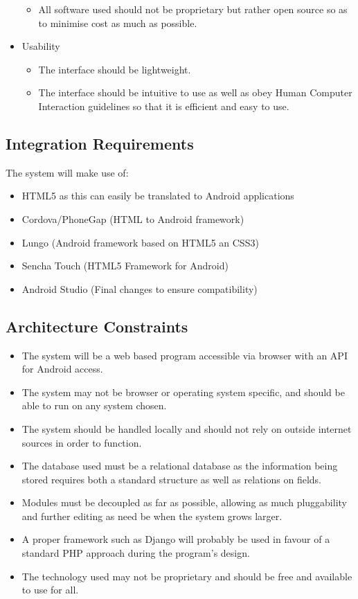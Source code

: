 \documentclass{article}
\begin{document}
\begin{itemize}
\begin{itemize}
					\item All software used should not be proprietary but rather open source so as to minimise cost as much as possible.
				\end{itemize}
				\item Usability
				\begin{itemize}
					\item The interface should be lightweight.
					\item The interface should be intuitive to use as well as obey Human Computer Interaction guidelines so that it is efficient and easy to use.
				\end{itemize}
			\end{itemize}
		
		\cleardoublepage
		\subsection{Integration Requirements}\label{subsec:integration}
		The system will make use of:
			\begin{itemize}
			  	\item HTML5 as this can easily be translated to Android applications
			  	\item Cordova/PhoneGap (HTML to Android framework)
			  	\item Lungo (Android framework based on HTML5 an CSS3)
			  	\item Sencha Touch (HTML5 Framework for Android)
			  	\item Android Studio (Final changes to ensure compatibility)
			\end{itemize}
				
		\subsection{Architecture Constraints}\label{subsec:constraints}
			\begin{itemize}
				\item The system will be a web based program accessible via browser with an API for Android access.
			  	\item The system may not be browser or operating system specific, and should be able to run on any system chosen.
			  	\item The system should be handled locally and should not rely on outside internet sources in order to function.
		  		\item The database used must be a relational database as the information being stored requires both a standard structure as well as relations on fields.
		  		\item Modules must be decoupled as far as possible, allowing as much pluggability and further editing as need be when the system grows larger.
	  			\item A proper framework such as Django will probably be used in favour of a standard PHP approach during the program's design.
	  			\item The technology used may not be proprietary and should be free and available to use for all.
			\end{itemize}
		
\end{document}
